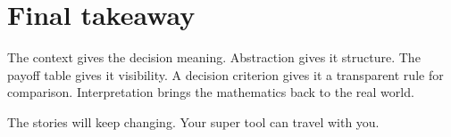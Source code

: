 	\section{Final takeaway}
	\begin{bigidea}
		\centering\large
		The context gives the decision meaning. Abstraction gives it structure. The
		payoff table gives it visibility. A decision criterion gives it a transparent
		rule for comparison. Interpretation brings the mathematics back to the real
		world.
	\end{bigidea}
	
	The stories will keep changing. Your super tool can travel with you.
	

